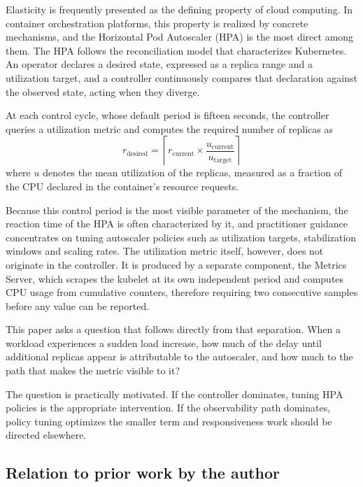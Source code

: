 \documentclass[conference]{IEEEtran}
\begin{document}
Elasticity is frequently presented as the defining property of cloud computing.
In container orchestration platforms, this property is realized by concrete
mechanisms, and the Horizontal Pod Autoscaler (HPA) is the most direct among
them. The HPA follows the reconciliation model that characterizes Kubernetes.
An operator declares a desired state, expressed as a replica range and a
utilization target, and a controller continuously compares that declaration
against the observed state, acting when they diverge.

At each control cycle, whose default period is fifteen seconds, the controller
queries a utilization metric and computes the required number of replicas as
\begin{equation}
r_{\text{desired}} = \left\lceil r_{\text{current}} \times
\frac{u_{\text{current}}}{u_{\text{target}}} \right\rceil
\end{equation}
where $u$ denotes the mean utilization of the replicas, measured as a fraction
of the CPU declared in the container's resource requests.

Because this control period is the most visible parameter of the mechanism, the
reaction time of the HPA is often characterized by it, and practitioner guidance
concentrates on tuning autoscaler policies such as utilization targets,
stabilization windows and scaling rates. The utilization metric itself, however,
does not originate in the controller. It is produced by a separate component,
the Metrics Server, which scrapes the kubelet at its own independent period and
computes CPU usage from cumulative counters, therefore requiring two consecutive
samples before any value can be reported.

This paper asks a question that follows directly from that separation. When a
workload experiences a sudden load increase, how much of the delay until
additional replicas appear is attributable to the autoscaler, and how much to
the path that makes the metric visible to it?

The question is practically motivated. If the controller dominates, tuning HPA
policies is the appropriate intervention. If the observability path dominates,
policy tuning optimizes the smaller term and responsiveness work should be
directed elsewhere.

\subsection{Relation to prior work by the author}
\end{document}
